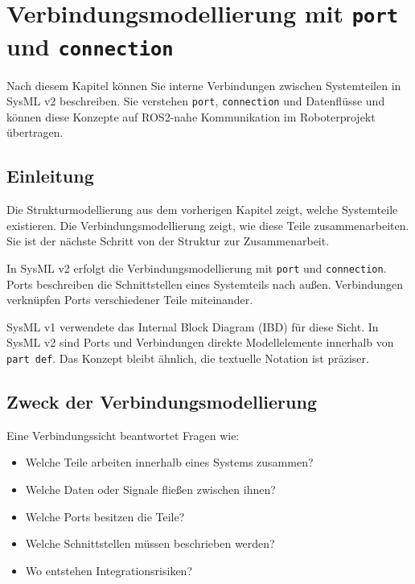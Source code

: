 \chapter{Verbindungsmodellierung mit \texttt{port} und \texttt{connection}}

\begin{lernziele}
Nach diesem Kapitel können Sie interne Verbindungen zwischen Systemteilen in SysML v2 beschreiben. Sie verstehen \texttt{port}, \texttt{connection} und Datenflüsse und können diese Konzepte auf ROS2-nahe Kommunikation im Roboterprojekt übertragen.
\end{lernziele}

\section{Einleitung}
Die Strukturmodellierung aus dem vorherigen Kapitel zeigt, welche Systemteile existieren. Die Verbindungsmodellierung zeigt, wie diese Teile zusammenarbeiten. Sie ist der nächste Schritt von der Struktur zur Zusammenarbeit.

In SysML v2 erfolgt die Verbindungsmodellierung mit \texttt{port} und \texttt{connection}. Ports beschreiben die Schnittstellen eines Systemteils nach außen. Verbindungen verknüpfen Ports verschiedener Teile miteinander.

\begin{hinweisbox}
SysML v1 verwendete das Internal Block Diagram (IBD) für diese Sicht. In SysML v2 sind Ports und Verbindungen direkte Modellelemente innerhalb von \texttt{part def}. Das Konzept bleibt ähnlich, die textuelle Notation ist präziser.
\end{hinweisbox}

\section{Zweck der Verbindungsmodellierung}
Eine Verbindungssicht beantwortet Fragen wie:

\begin{itemize}
    \item Welche Teile arbeiten innerhalb eines Systems zusammen?
    \item Welche Daten oder Signale fließen zwischen ihnen?
    \item Welche Ports besitzen die Teile?
    \item Welche Schnittstellen müssen beschrieben werden?
    \item Wo entstehen Integrationsrisiken?
\end{itemize}

